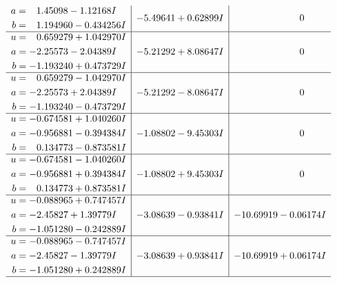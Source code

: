 \documentclass[1p]{elsarticle_modified}
\theoremstyle{definition}
\begin{document}
$$\begin{array}{c|c|c}
\begin{aligned}
a &= \phantom{-}1.45098 - 1.12168 I \\
b &= \phantom{-}1.194960 - 0.434256 I\end{aligned}
 & -5.49641 + 0.62899 I & \phantom{-0.000000 } 0 \\ \hline\begin{aligned}
u &= \phantom{-}0.659279 + 1.042970 I \\
a &= -2.25573 - 2.04389 I \\
b &= -1.193240 + 0.473729 I\end{aligned}
 & -5.21292 + 8.08647 I & \phantom{-0.000000 } 0 \\ \hline\begin{aligned}
u &= \phantom{-}0.659279 - 1.042970 I \\
a &= -2.25573 + 2.04389 I \\
b &= -1.193240 - 0.473729 I\end{aligned}
 & -5.21292 - 8.08647 I & \phantom{-0.000000 } 0 \\ \hline\begin{aligned}
u &= -0.674581 + 1.040260 I \\
a &= -0.956881 - 0.394384 I \\
b &= \phantom{-}0.134773 - 0.873581 I\end{aligned}
 & -1.08802 - 9.45303 I & \phantom{-0.000000 } 0 \\ \hline\begin{aligned}
u &= -0.674581 - 1.040260 I \\
a &= -0.956881 + 0.394384 I \\
b &= \phantom{-}0.134773 + 0.873581 I\end{aligned}
 & -1.08802 + 9.45303 I & \phantom{-0.000000 } 0 \\ \hline\begin{aligned}
u &= -0.088965 + 0.747457 I \\
a &= -2.45827 + 1.39779 I \\
b &= -1.051280 - 0.242889 I\end{aligned}
 & -3.08639 - 0.93841 I & -10.69919 - 0.06174 I \\ \hline\begin{aligned}
u &= -0.088965 - 0.747457 I \\
a &= -2.45827 - 1.39779 I \\
b &= -1.051280 + 0.242889 I\end{aligned}
 & -3.08639 + 0.93841 I & -10.69919 + 0.06174 I\\
 \hline 
 \end{array}$$\newpage$$\begin{array}{c|c|c}  

\end{array}$$
\end{document}
